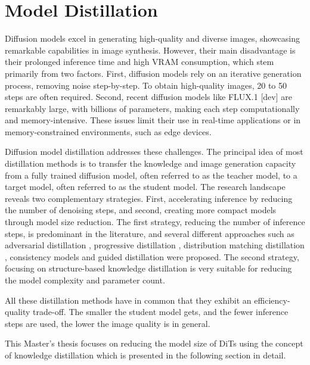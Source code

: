 \section{Model Distillation}
\label{sec:ModelDistillationFundamentals}
Diffusion models excel in generating high-quality and diverse images, showcasing remarkable capabilities in image synthesis. However, their main disadvantage is their prolonged inference time and high \gls{VRAM} consumption, which stem primarily from two factors. First, diffusion models rely on an iterative generation process, removing noise step-by-step. To obtain high-quality images, 20 to 50 steps are often required. Second, recent diffusion models like FLUX.1 [dev] \cite{Flux} are remarkably large, with billions of parameters, making each step computationally and memory-intensive. These issues limit their use in real-time applications or in memory-constrained environments, such as edge devices.

Diffusion model distillation addresses these challenges. The principal idea of most distillation methods is to transfer the knowledge and image generation capacity from a fully trained diffusion model, often referred to as the teacher model, to a target model, often referred to as the student model. The research landscape reveals two complementary strategies. First, accelerating inference by reducing the number of denoising steps, and second, creating more compact models through model size reduction. The first strategy, reducing the number of inference steps, is predominant in the literature, and several different approaches such as adversarial distillation \cite{ADD, LADD}, progressive distillation \cite{ProgressiveDistillation, SDXL_Lightning}, distribution matching distillation \cite{DistillationMatching, ImprovedDistillationMatching}, consistency models \cite{ConsistencyModel, LatentConsistencyModel} and guided distillation \cite{GuidedDistillation} were proposed. The second strategy, focusing on structure-based knowledge distillation \cite{KnowledgeDistillation} is very suitable for reducing the model complexity and parameter count. 

All these distillation methods have in common that they exhibit an efficiency-quality trade-off. The smaller the student model gets, and the fewer inference steps are used, the lower the image quality is in general. 

This Master's thesis focuses on reducing the model size of \gls{DiT}s using the concept of knowledge distillation which is presented in the following section in detail.


